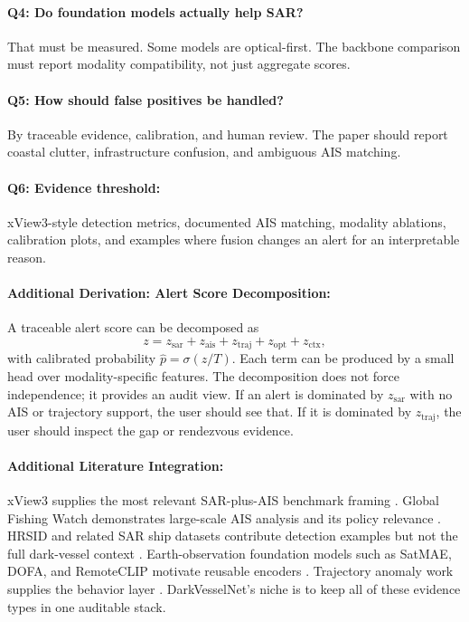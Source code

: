 \documentclass{article}
\begin{document}
\paragraph{Q4: Do foundation models actually help SAR?}
That must be measured. Some models are optical-first. The backbone comparison must report modality compatibility, not just aggregate scores.

\paragraph{Q5: How should false positives be handled?}
By traceable evidence, calibration, and human review. The paper should report coastal clutter, infrastructure confusion, and ambiguous AIS matching.

\paragraph{Q6: Evidence threshold:}
xView3-style detection metrics, documented AIS matching, modality ablations, calibration plots, and examples where fusion changes an alert for an interpretable reason.

\paragraph{Additional Derivation: Alert Score Decomposition:}

A traceable alert score can be decomposed as
\begin{equation}
  z = z_{\text{sar}} + z_{\text{ais}} + z_{\text{traj}} + z_{\text{opt}} + z_{\text{ctx}},
\end{equation}
with calibrated probability $\hat{p}=\sigma(z/T)$. Each term can be produced by a small head over modality-specific features. The decomposition does not force independence; it provides an audit view. If an alert is dominated by $z_{\text{sar}}$ with no AIS or trajectory support, the user should see that. If it is dominated by $z_{\text{traj}}$, the user should inspect the gap or rendezvous evidence.

\paragraph{Additional Literature Integration:}

xView3 supplies the most relevant SAR-plus-AIS benchmark framing \citep{paolo2022xview3}. Global Fishing Watch demonstrates large-scale AIS analysis and its policy relevance \citep{kroodsma2018tracking}. HRSID and related SAR ship datasets contribute detection examples but not the full dark-vessel context \citep{wei2020hrsid}. Earth-observation foundation models such as SatMAE, DOFA, and RemoteCLIP motivate reusable encoders \citep{cong2022satmae,xiong2024dofa,liu2024remoteclip}. Trajectory anomaly work supplies the behavior layer \citep{nguyen2020geotracknet,sharma2022tist}. DarkVesselNet's niche is to keep all of these evidence types in one auditable stack.
\end{document}
